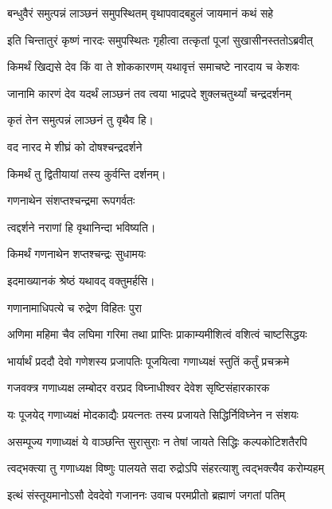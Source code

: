 \twolineshloka
{बन्धुवैरं समुत्पन्नं लाञ्छनं समुपस्थितम्}
{वृथापवादबहुलं जायमानं कथं सहे}%

\twolineshloka
{इति चिन्तातुरं कृष्णं नारदः समुपस्थितः}
{गृहीत्वा तत्कृतां पूजां सुखासीनस्ततोऽब्रवीत्}%


\twolineshloka
{किमर्थं खिद्यसे देव किं वा ते शोककारणम्}
{यथावृत्तं समाचष्टे नारदाय च केशवः}%


\twolineshloka
{जानामि कारणं देव यदर्थं लाञ्छनं तव}
{त्वया भाद्रपदे शुक्लचतुर्थ्यां चन्द्रदर्शनम्}%

{कृतं तेन समुत्पन्नं लाञ्छनं तु वृथैव हि।}


\onelineshloka
{वद नारद मे शीघ्रं को दोषश्चन्द्रदर्शने}%

{किमर्थं तु द्वितीयायां तस्य कुर्वन्ति दर्शनम्।}


\onelineshloka
{गणनाथेन संशप्तश्चन्द्रमा रूपगर्वतः}%

{त्वद्दर्शने नराणां हि वृथानिन्दा भविष्यति।}

\onelineshloka
{किमर्थं गणनाथेन शप्तश्चन्द्रः सुधामयः}%

{इदमाख्यानकं श्रेष्ठं यथावद् वक्तुमर्हसि।} 

\onelineshloka
{गणानामाधिपत्ये च रुद्रेण विहितः पुरा}%

\twolineshloka
{अणिमा महिमा चैव लघिमा गरिमा तथा}
{प्राप्तिः प्राकाम्यमीशित्वं वशित्वं चाष्टसिद्धयः}%

\twolineshloka
{भार्यार्थं प्रददौ देवो गणेशस्य प्रजापतिः}
{पूजयित्वा गणाध्यक्षं स्तुतिं कर्तुं प्रचक्रमे}%


\twolineshloka
{गजवक्त्र गणाध्यक्ष लम्बोदर वरप्रद}
{विघ्नाधीश्वर देवेश सृष्टिसंहारकारक}%

\twolineshloka
{यः पूजयेद् गणाध्यक्षं मोदकाद्यैः प्रयत्नतः}
{तस्य प्रजायते सिद्धिर्निविघ्नेन न संशयः}%

\twolineshloka
{असम्पूज्य गणाध्यक्षं ये वाञ्छन्ति सुरासुराः}
{न तेषां जायते सिद्धिः कल्पकोटिशतैरपि}%

\twolineshloka
{त्वद्भक्त्या तु गणाध्यक्ष विष्णुः पालयते सदा}
{रुद्रोऽपि संहरत्याशु त्वद्भक्त्यैव करोम्यहम्}%

\twolineshloka
{इत्थं संस्तूयमानोऽसौ देवदेवो गजाननः}
{उवाच परमप्रीतो ब्रह्माणं जगतां पतिम्}%

